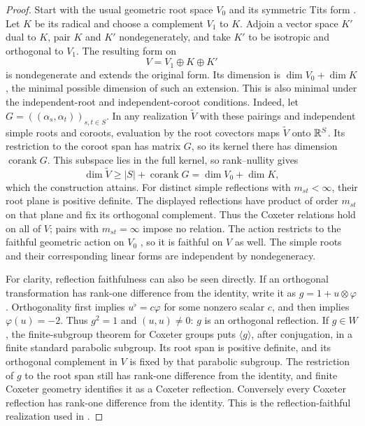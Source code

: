 \begin{proof}
Start with the usual geometric root space $V_0$ and its symmetric Tits form
\cite[Sections~4.2--4.4]{BB05}.
Let $K$ be its radical and choose a complement $V_1$ to $K$.  Adjoin a vector
space $K'$ dual to $K$, pair $K$ and $K'$ nondegenerately, and take $K'$ to be
isotropic and orthogonal to $V_1$.  The resulting form on
\[
 V=V_1\oplus K\oplus K'
\]
is nondegenerate and extends the original form.  Its dimension is
$\dim V_0+\dim K$, the minimal possible dimension of such an extension.
This is also minimal under the independent-root and independent-coroot
conditions.  Indeed, let $G=((\alpha_s,\alpha_t))_{s,t\in S}$.  In any
realization $\widetilde V$ with these pairings and independent simple roots
and coroots, evaluation by the root covectors maps $\widetilde V$ onto $\mathbb R^S$.
Its restriction to the coroot span has matrix $G$, so its kernel there
has dimension $\operatorname{corank}G$.  This subspace lies in the full
kernel, so rank--nullity gives
\[
 \dim\widetilde V\ge |S|+\operatorname{corank}G=\dim V_0+\dim K,
\]
which the construction attains.
For distinct simple reflections with $m_{st}<\infty$, their root plane is
positive definite. The displayed reflections have product of order $m_{st}$
on that plane and fix its orthogonal complement. Thus the Coxeter relations
hold on all of $V$; pairs with $m_{st}=\infty$ impose no relation.
The action restricts to the faithful geometric action on $V_0$
\cite[Theorem~4.2.7]{BB05},
so it is faithful on $V$ as well.
The simple roots and their corresponding linear forms are independent by
nondegeneracy.

For clarity, reflection faithfulness can also be seen directly.  If an
orthogonal transformation has rank-one difference from the identity, write
it as $g=1+u\otimes\varphi$.  Orthogonality first implies
$u^{\flat}=c\varphi$ for some nonzero scalar $c$, and then implies
$\varphi(u)=-2$.  Thus $g^2=1$ and $(u,u)\ne0$: $g$ is an orthogonal
reflection.  If $g\in W$, the finite-subgroup theorem for Coxeter groups
\cite[Theorem~12.3.4(i)]{Davis08} puts
$\langle g\rangle$, after conjugation, in a finite standard parabolic
subgroup.  Its root span is positive definite, and its orthogonal complement
in $V$ is fixed by that parabolic subgroup.  The restriction of $g$ to the
root span still has rank-one difference from the identity, and finite
Coxeter geometry identifies it as a Coxeter reflection.  Conversely every
Coxeter reflection has rank-one difference from the identity.  This is the
reflection-faithful realization used in \cite[Section~3.1]{EW14}.


\end{proof}
